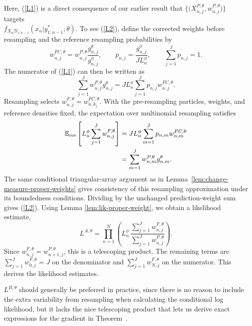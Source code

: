 Here, (\ref{L1}) is a direct consequence of our earlier result that $\{ \big(X^{P,\theta}_{n,j},w^{P,\theta}_{n,j}\big) \}$ targets\\
$f_{X_{n}|Y_{1:n-1}}(x_{n}|y^*_{1:n-1};\theta)$.
To see (\ref{L2}), define the corrected weights before resampling and the
reference resampling probabilities by
\begin{equation}
w_{n,j}^{FC,\theta}
=w_{n,j}^{P,\theta}\frac{g_{n,j}^\theta}{g_{n,j}^\phi},
\qquad
p_{n,j}=\frac{g_{n,j}^\phi}{JL_n^\phi},
\qquad \sum_{j=1}^Jp_{n,j}=1.
\end{equation}
The numerator of (\ref{L1}) can then be written as
\begin{equation}
\sum_{j=1}^Jw_{n,j}^{P,\theta}g_{n,j}^\theta
=JL_n^\phi\sum_{j=1}^Jp_{n,j}w_{n,j}^{FC,\theta}.
\end{equation}
Resampling selects $w_{n,j}^{F,\theta}=w_{n,k_j}^{FC,\theta}$.
With the pre-resampling particles, weights, and reference densities fixed,
the expectation over multinomial resampling satisfies
\begin{align}
\mathbb{E}_{\mathrm{res}}\left[L_n^\phi\sum_{j=1}^Jw_{n,j}^{F,\theta}\right]
&=JL_n^\phi\sum_{m=1}^Jp_{n,m}w_{n,m}^{FC,\theta} \notag\\*
&=\sum_{m=1}^Jw_{n,m}^{P,\theta}g_{n,m}^\theta.
\end{align}
The same conditional triangular-array argument as in
Lemma~\ref{lem:change-measure-proper-weights} gives consistency of this
resampling approximation under its boundedness conditions. Dividing by
the unchanged prediction-weight sum gives (\ref{L2}).
Using Lemma \ref{lem:lik-proper-weight}, we obtain a likelihood estimate,
\begin{equation}
L^{A,\theta} = \prod_{n=1}^N \left( L^\phi_n \, \frac{\sum_{j=1}^J w^{F,\theta}_{n,j}}{\sum_{j=1}^J w^{P,\theta}_{n,j}}\right).
\end{equation}
Since $w^{F,\theta}_{n,j}=w^{P,\theta}_{n+1,j}$, this is a telescoping product. The remaining terms are
$\sum_{j=1}^J w^{F,\theta}_{0,j} = J$ on the denominator and $\sum_{j=1}^J w^{F,\theta}_{N,j}$ on the numerator.
This derives the  likelihood estimates.


$L^{B,\theta}$ should generally be preferred in practice, since there is no reason to include the extra variability from resampling when calculating the conditional log likelihood, but it lacks the nice telescoping product that lets us derive exact expressions for the gradient in Theorem~\thmMopFunctionalForms.



